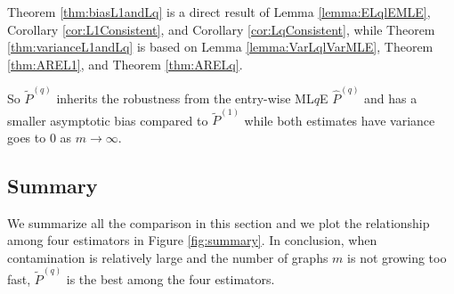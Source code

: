 \documentclass[a4paper]{article}
\renewcommand{\hat}{\widehat}
\begin{document}
Theorem \ref{thm:biasL1andLq} is a direct result of Lemma \ref{lemma:ELqlEMLE}, Corollary \ref{cor:L1Consistent}, and Corollary \ref{cor:LqConsistent}, while Theorem \ref{thm:varianceL1andLq} is based on Lemma \ref{lemma:VarLqlVarMLE}, Theorem \ref{thm:AREL1}, and Theorem \ref{thm:ARELq}.

So $\widetilde{P}^{(q)}$ inherits the robustness from the entry-wise ML$q$E $\hat{P}^{(q)}$ and has a smaller asymptotic bias compared to $\widetilde{P}^{(1)}$ while both estimates have variance goes to 0 as $m \to \infty$.


\subsection{Summary}
We summarize all the comparison in this section and we plot the relationship among four estimators in Figure \ref{fig:summary}. In conclusion, when contamination is relatively large and the number of graphs $m$ is not growing too fast, $\widetilde{P}^{(q)}$ is the best among the four estimators.
\end{document}
